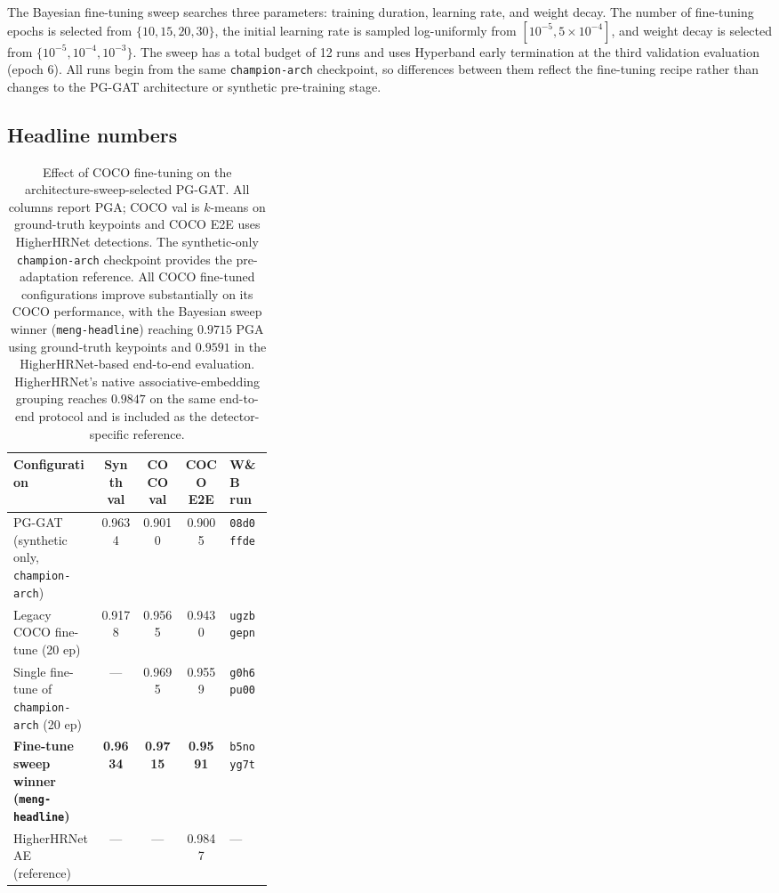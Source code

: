 The Bayesian fine-tuning sweep searches three parameters:
training duration,
learning rate,
and weight decay.
The number of fine-tuning epochs is selected from $\{10,15,20,30\}$,
the initial learning rate is sampled log-uniformly from
$[10^{-5},5\times10^{-4}]$,
and weight decay is selected from $\{10^{-5},10^{-4},10^{-3}\}$.
The sweep has a total budget of 12 runs
and uses Hyperband early termination at the third validation evaluation
(epoch $6$).
All runs begin from the same \texttt{champion-arch} checkpoint,
so differences between them reflect the fine-tuning recipe
rather than changes to the PG-GAT architecture or synthetic
pre-training stage.

\subsection{Headline numbers}
\label{sec_res_coco_ft_numbers}
\label{sec_results_headline}

\begin{table}[H]
\centering
\caption[Effect of COCO fine-tuning on the architecture-sweep-selected PG-GAT.]{Effect of COCO fine-tuning on the architecture-sweep-selected
PG-GAT. All columns report PGA; COCO val is $k$-means on ground-truth keypoints
and COCO E2E uses HigherHRNet detections. The synthetic-only \texttt{champion-arch} checkpoint provides
the pre-adaptation reference. All COCO fine-tuned configurations improve
substantially on its COCO performance, with the Bayesian sweep winner
(\texttt{meng-headline}) reaching $0.9715$ PGA using ground-truth
keypoints and $0.9591$ in the HigherHRNet-based end-to-end evaluation.
HigherHRNet's native associative-embedding grouping reaches $0.9847$ on
the same end-to-end protocol and is included as the detector-specific
reference.}
\label{tab:coco_ft_headline}
\tablesize
\begin{tabular}{>{\raggedright\arraybackslash}p{0.34\linewidth}cccl}
\toprule
Configuration
& Synth val
& COCO val
& COCO E2E
& W\&B run \\
\midrule
PG-GAT (synthetic only, \texttt{champion-arch})
    & 0.9634 & 0.9010 & 0.9005 & \texttt{08d0ffde} \\
\midrule
Legacy COCO fine-tune (20 ep)
    & 0.9178 & 0.9565 & 0.9430 & \texttt{ugzbgepn} \\
Single fine-tune of \texttt{champion-arch} (20 ep)
    & --- & 0.9695 & 0.9559 & \texttt{g0h6pu00} \\
\textbf{Fine-tune sweep winner (\texttt{meng-headline})}
    & \textbf{0.9634} & \textbf{0.9715} & \textbf{0.9591} & \texttt{b5noyg7t} \\
\midrule
HigherHRNet AE (reference)
    & --- & --- & 0.9847 & --- \\
\bottomrule
\end{tabular}
\end{table}

